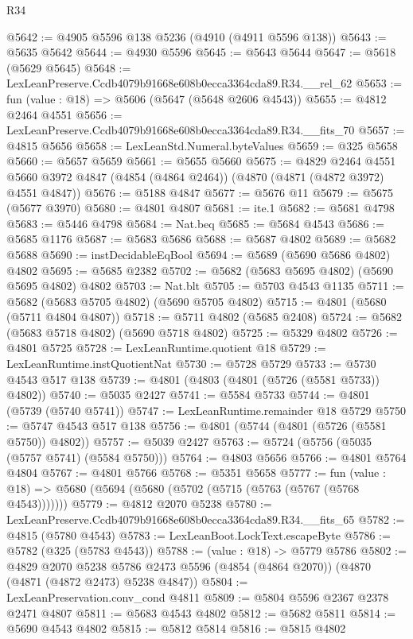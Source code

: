 \begin{lexlean}{R34}
\begin{coremodule}
@5642 := @4905 @5596 @138 @5236 (@4910 (@4911 @5596 @138))
@5643 := @5635 @5642
@5644 := @4930 @5596
@5645 := @5643 @5644
@5647 := @5618 (@5629 @5645)
@5648 := LexLeanPreserve.Ccdb4079b91668e608b0ecca3364cda89.R34.__rel_62
@5653 := fun (value : @18) => @5606 (@5647 (@5648 @2606 @4543))
@5655 := @4812 @2464 @4551
@5656 := LexLeanPreserve.Ccdb4079b91668e608b0ecca3364cda89.R34.__fits_70
@5657 := @4815 @5656
@5658 := LexLeanStd.Numeral.byteValues
@5659 := @325 @5658
@5660 := @5657 @5659
@5661 := @5655 @5660
@5675 := @4829
    @2464
    @4551
    @5660
    @3972
    @4847
    (@4854 (@4864 @2464))
    (@4870 (@4871 (@4872 @3972) @4551 @4847))
@5676 := @5188 @4847
@5677 := @5676 @11
@5679 := @5675 (@5677 @3970)
@5680 := @4801 @4807
@5681 := ite.{1}
@5682 := @5681 @4798
@5683 := @5446 @4798
@5684 := Nat.beq
@5685 := @5684 @4543
@5686 := @5685 @1176
@5687 := @5683 @5686
@5688 := @5687 @4802
@5689 := @5682 @5688
@5690 := instDecidableEqBool
@5694 := @5689 (@5690 @5686 @4802) @4802
@5695 := @5685 @2382
@5702 := @5682 (@5683 @5695 @4802) (@5690 @5695 @4802) @4802
@5703 := Nat.blt
@5705 := @5703 @4543 @1135
@5711 := @5682 (@5683 @5705 @4802) (@5690 @5705 @4802)
@5715 := @4801 (@5680 (@5711 @4804 @4807))
@5718 := @5711 @4802 (@5685 @2408)
@5724 := @5682 (@5683 @5718 @4802) (@5690 @5718 @4802)
@5725 := @5329 @4802
@5726 := @4801 @5725
@5728 := LexLeanRuntime.quotient @18
@5729 := LexLeanRuntime.instQuotientNat
@5730 := @5728 @5729
@5733 := @5730 @4543 @517 @138
@5739 := @4801 (@4803 (@4801 (@5726 (@5581 @5733)) @4802))
@5740 := @5035 @2427
@5741 := @5584 @5733
@5744 := @4801 (@5739 (@5740 @5741))
@5747 := LexLeanRuntime.remainder @18 @5729
@5750 := @5747 @4543 @517 @138
@5756 := @4801 (@5744 (@4801 (@5726 (@5581 @5750)) @4802))
@5757 := @5039 @2427
@5763 := @5724 (@5756 (@5035 (@5757 @5741) (@5584 @5750)))
@5764 := @4803 @5656
@5766 := @4801 @5764 @4804
@5767 := @4801 @5766
@5768 := @5351 @5658
@5777 := fun (value : @18) => @5680 (@5694 (@5680 (@5702 (@5715 (@5763 (@5767 (@5768 @4543)))))))
@5779 := @4812 @2070 @5238
@5780 := LexLeanPreserve.Ccdb4079b91668e608b0ecca3364cda89.R34.__fits_65
@5782 := @4815 (@5780 @4543)
@5783 := LexLeanBoot.LockText.escapeByte
@5786 := @5782 (@325 (@5783 @4543))
@5788 := (value : @18) -> @5779 @5786
@5802 := @4829
    @2070
    @5238
    @5786
    @2473
    @5596
    (@4854 (@4864 @2070))
    (@4870 (@4871 (@4872 @2473) @5238 @4847))
@5804 := LexLeanPreservation.conv_cond @4811
@5809 := @5804 @5596 @2367 @2378 @2471 @4807
@5811 := @5683 @4543 @4802
@5812 := @5682 @5811
@5814 := @5690 @4543 @4802
@5815 := @5812 @5814
@5816 := @5815 @4802

\end{coremodule}
\end{lexlean}
